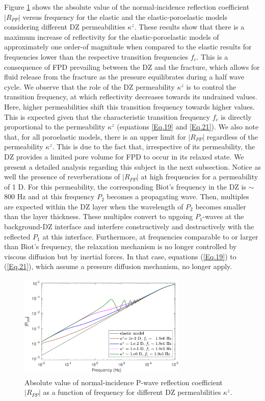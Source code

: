 \documentclass[draft]{agujournal2019}
\begin{document}
Figure \ref{fig:2} shows the absolute value of the normal-incidence reflection coefficient $|R_{PP}|$ versus frequency for the elastic and the elastic-poroelastic models considering different DZ permeabilities $\kappa^z$. These results show that there is a maximum increase of reflectivity for the elastic-poroelastic models of approximately one order-of magnitude when compared to the elastic results for frequencies lower than the respective transition frequencies $f_c$. This is a consequence of FPD prevailing between the DZ and the fracture, which allows for fluid release from the fracture as the pressure equilibrates during a half wave cycle. 
We observe that the role of the DZ permeability $\kappa^z$ is to control the transition frequency, at which reflectivity decreases towards its undrained values. Here, higher permeabilities shift this transition frequency towards higher values. This is expected given that the characteristic transition frequency $f_c$ is directly proportional to the permeability $\kappa^z$ (equations \ref{Eq.19} and \ref{Eq.21}). We also note that, for all poroelastic models, there is an upper limit for $|R_{PP}|$ regardless of the permeability $\kappa^z$. This is due to the fact that, irrespective of its permeability, the DZ provides a limited pore volume for FPD to occur in its relaxed state. We present a detailed analysis regarding this subject in the next subsection. Notice as well the presence of reverberations of $|R_{PP}|$ at high frequencies for a permeability of 1 D. For this permeability, the corresponding Biot's frequency in the DZ is $ \sim$ 800 Hz and at this frequency $P_2$ becomes a propagating wave. Then, multiples are expected within the DZ layer when the wavelength of $P_2$ becomes smaller than the layer thickness. These multiples convert to upgoing $P_1$-waves at the background-DZ interface and interfere constructively and destructively with the reflected $P_1$ at this interface. Furthermore, at frequencies comparable to or larger than Biot's frequency, the relaxation mechanism is no longer controlled  by viscous diffusion but by inertial forces. In that case, equations (\ref{Eq.19}) to (\ref{Eq.21}), which assume a pressure diffusion mechanism, no longer apply.

\begin{figure}
\centering

        \includegraphics[width=80mm, height=50mm]{figures/elasporo_1mm_ksen_h20e-2.pdf}
\caption {Absolute value of normal-incidence P-wave reflection coefficient $|R_{PP}|$ as a function of frequency for different DZ permeabilities $\kappa^z$.}
\label{fig:2}
\end{figure}
\end{document}
